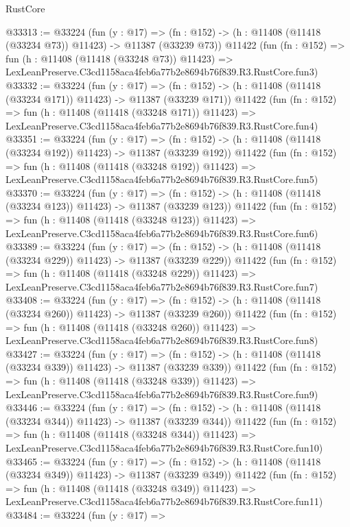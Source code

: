 \begin{lexlean}{RustCore}
\begin{coremodule}
@33313 := @33224
    (fun (y : @17) =>
    (fn : @152) -> (h : @11408 (@11418 (@33234 @73)) @11423) -> @11387 (@33239 @73))
    @11422
    (fun (fn : @152) =>
    fun (h : @11408 (@11418 (@33248 @73)) @11423) =>
    LexLeanPreserve.C3cd1158aca4feb6a77b2e8694b76f839.R3.RustCore.fun3)
@33332 := @33224
    (fun (y : @17) =>
    (fn : @152) -> (h : @11408 (@11418 (@33234 @171)) @11423) -> @11387 (@33239 @171))
    @11422
    (fun (fn : @152) =>
    fun (h : @11408 (@11418 (@33248 @171)) @11423) =>
    LexLeanPreserve.C3cd1158aca4feb6a77b2e8694b76f839.R3.RustCore.fun4)
@33351 := @33224
    (fun (y : @17) =>
    (fn : @152) -> (h : @11408 (@11418 (@33234 @192)) @11423) -> @11387 (@33239 @192))
    @11422
    (fun (fn : @152) =>
    fun (h : @11408 (@11418 (@33248 @192)) @11423) =>
    LexLeanPreserve.C3cd1158aca4feb6a77b2e8694b76f839.R3.RustCore.fun5)
@33370 := @33224
    (fun (y : @17) =>
    (fn : @152) -> (h : @11408 (@11418 (@33234 @123)) @11423) -> @11387 (@33239 @123))
    @11422
    (fun (fn : @152) =>
    fun (h : @11408 (@11418 (@33248 @123)) @11423) =>
    LexLeanPreserve.C3cd1158aca4feb6a77b2e8694b76f839.R3.RustCore.fun6)
@33389 := @33224
    (fun (y : @17) =>
    (fn : @152) -> (h : @11408 (@11418 (@33234 @229)) @11423) -> @11387 (@33239 @229))
    @11422
    (fun (fn : @152) =>
    fun (h : @11408 (@11418 (@33248 @229)) @11423) =>
    LexLeanPreserve.C3cd1158aca4feb6a77b2e8694b76f839.R3.RustCore.fun7)
@33408 := @33224
    (fun (y : @17) =>
    (fn : @152) -> (h : @11408 (@11418 (@33234 @260)) @11423) -> @11387 (@33239 @260))
    @11422
    (fun (fn : @152) =>
    fun (h : @11408 (@11418 (@33248 @260)) @11423) =>
    LexLeanPreserve.C3cd1158aca4feb6a77b2e8694b76f839.R3.RustCore.fun8)
@33427 := @33224
    (fun (y : @17) =>
    (fn : @152) -> (h : @11408 (@11418 (@33234 @339)) @11423) -> @11387 (@33239 @339))
    @11422
    (fun (fn : @152) =>
    fun (h : @11408 (@11418 (@33248 @339)) @11423) =>
    LexLeanPreserve.C3cd1158aca4feb6a77b2e8694b76f839.R3.RustCore.fun9)
@33446 := @33224
    (fun (y : @17) =>
    (fn : @152) -> (h : @11408 (@11418 (@33234 @344)) @11423) -> @11387 (@33239 @344))
    @11422
    (fun (fn : @152) =>
    fun (h : @11408 (@11418 (@33248 @344)) @11423) =>
    LexLeanPreserve.C3cd1158aca4feb6a77b2e8694b76f839.R3.RustCore.fun10)
@33465 := @33224
    (fun (y : @17) =>
    (fn : @152) -> (h : @11408 (@11418 (@33234 @349)) @11423) -> @11387 (@33239 @349))
    @11422
    (fun (fn : @152) =>
    fun (h : @11408 (@11418 (@33248 @349)) @11423) =>
    LexLeanPreserve.C3cd1158aca4feb6a77b2e8694b76f839.R3.RustCore.fun11)
@33484 := @33224
    (fun (y : @17) =>

\end{coremodule}
\end{lexlean}
